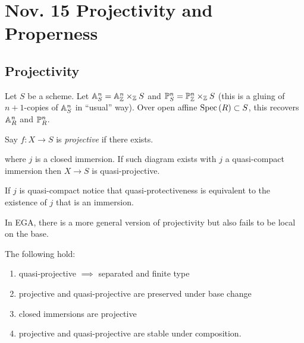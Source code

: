 \documentclass[12pt]{article}
\begin{document}
\section{Nov. 15 Projectivity and Properness}

\subsection{Projectivity}

\begin{defn}
Let $S$ be a scheme. Let $\A^n_S = \A_\Z^n \times_\Z S$ and $\P^n_S = \P^n_\Z \times_\Z S$ (this is a gluing of $n+1$-copies of $\A^n_S$ in ``usual'' way). Over open affine $\Spec{R} \subset S$, this recovers $\A^n_R$ and $\P^n_R$.
\end{defn}

\begin{defn}
Say $f : X \to S$ is \textit{projective} if there exists.
\begin{center}
\end{center}
where $j$ is a closed immersion. If such diagram exists with $j$ a quasi-compact immersion then $X \to S$ is quasi-projective.
\end{defn}

\begin{rmk}
If $j$ is quasi-compact notice that quasi-protectiveness is equivalent to the existence of $j$ that is an immersion.
\end{rmk}

\begin{rmk}
In EGA, there is a more general version of projectivity but also fails to be local on the base.
\end{rmk}

\begin{prop}
The following hold:
\begin{enumerate}
\item quasi-projective $\implies$ separated and finite type
\item projective and quasi-projective are preserved under base change
\item closed immersions are projective
\item projective and quasi-projective are stable under composition. 
\end{enumerate}
\end{prop}
\end{document}
